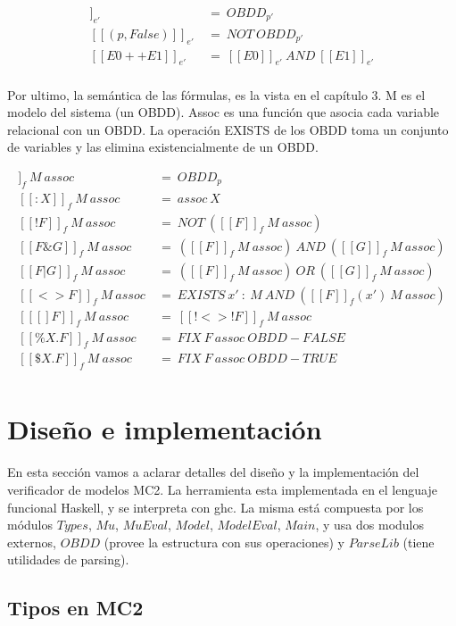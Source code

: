 \begin{align*}
[[(p,True)]]_{e'}\ &=\ OBDD_{p'} \\
[[(p,False)]]_{e'}\ &=\ NOT\ OBDD_{p'} \\
[[E0++E1]]_{e'}\ &=\ [[E0]]_{e'}\ AND\ [[E1]]_{e'} \\
\end{align*}

Por ultimo, la semántica de las fórmulas, es la vista en el capítulo 3. M es el modelo del sistema (un OBDD). Assoc es una función que asocia cada variable relacional con un OBDD. La operación EXISTS de los OBDD toma un conjunto de variables y las elimina existencialmente de un OBDD.

\begin{align*}
[[p]]_{f}\ M\ assoc\ &=\ OBDD_{p} \\
[[:X]]_{f}\ M\ assoc\ &=\ assoc\ X \\
[[!F]]_{f}\ M\ assoc\ &=\ NOT\ ([[F]]_{f}\ M\ assoc)\\
[[F \& G]]_{f}\ M\ assoc\ &=\ ([[F]]_{f}\ M\ assoc)\ AND\ ([[G]]_{f}\ M\ assoc)\\
[[F | G]]_{f}\ M\ assoc\ &=\ ([[F]]_{f}\ M\ assoc)\ OR\ ([[G]]_{f}\ M\ assoc)\\
[[<>F]]_{f}\ M\ assoc\ &=\ EXISTS\ x'\ :\ M\ AND\ ([[F]]_{f}(x')\ M\ assoc) \\
[[[]F]]_{f}\ M\ assoc\ &=\ [[!<>!F]]_{f}\ M\ assoc \\
[[\%X.F]]_{f}\ M\ assoc\ &=\ FIX\ F\ assoc\ OBDD-FALSE \\
[[\$X.F]]_{f}\ M\ assoc\ &=\ FIX\ F\ assoc\ OBDD-TRUE \\
\end{align*}

\section{Diseño e implementación}

En esta sección vamos a aclarar detalles del diseño y la implementación del verificador de modelos MC2. La herramienta esta implementada en el lenguaje funcional Haskell, y se interpreta con ghc. La misma está compuesta por los módulos $Types$, $Mu$, $MuEval$, $Model$, $ModelEval$, $Main$, y usa dos modulos externos, $OBDD$ \cite{Waldmann:6} (provee la estructura con sus operaciones) y $ParseLib$ \cite{Hutton:10} (tiene utilidades de parsing).

\subsection{Tipos en MC2}


